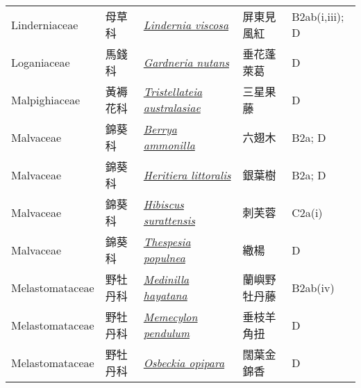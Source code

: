 {\begin{longtable}{p{2.5cm}p{2.5cm}p{4.5cm}p{2.5cm}p{3cm}}
    Linderniaceae & 母草科 & \href{http://www.theplantlist.org/tpl1.1/search?q=Lindernia+viscosa}{\textit{Lindernia viscosa} } & 屏東見風紅 & B2ab(i,iii); D \index{Lindernia@\textit{Lindernia}!viscosa@\textit{viscosa}}  \index{屏東見風紅} \\
    Loganiaceae & 馬錢科 & \href{http://www.theplantlist.org/tpl1.1/search?q=Gardneria+nutans}{\textit{Gardneria nutans} } & 垂花蓬萊葛 & D \index{Gardneria@\textit{Gardneria}!nutans@\textit{nutans}}  \index{垂花蓬萊葛} \\
    Malpighiaceae & 黃褥花科 & \href{http://www.theplantlist.org/tpl1.1/search?q=Tristellateia+australasiae}{\textit{Tristellateia australasiae} } & 三星果藤 & D \index{Tristellateia@\textit{Tristellateia}!australasiae@\textit{australasiae}}  \index{三星果藤} \\
    Malvaceae & 錦葵科 & \href{http://www.theplantlist.org/tpl1.1/search?q=Berrya+ammonilla}{\textit{Berrya ammonilla} } & 六翅木 & B2a; D \index{Berrya@\textit{Berrya}!ammonilla@\textit{ammonilla}}  \index{六翅木} \\
    Malvaceae & 錦葵科 & \href{http://www.theplantlist.org/tpl1.1/search?q=Heritiera+littoralis}{\textit{Heritiera littoralis} } & 銀葉樹 & B2a; D \index{Heritiera@\textit{Heritiera}!littoralis@\textit{littoralis}}  \index{銀葉樹} \\
    Malvaceae & 錦葵科 & \href{http://www.theplantlist.org/tpl1.1/search?q=Hibiscus+surattensis}{\textit{Hibiscus surattensis} } & 刺芙蓉 & C2a(i) \index{Hibiscus@\textit{Hibiscus}!surattensis@\textit{surattensis}}  \index{刺芙蓉} \\
    Malvaceae & 錦葵科 & \href{http://www.theplantlist.org/tpl1.1/search?q=Thespesia+populnea}{\textit{Thespesia populnea} } & 繖楊 & D \index{Thespesia@\textit{Thespesia}!populnea@\textit{populnea}}  \index{繖楊} \\
    Melastomataceae & 野牡丹科 & \href{http://www.theplantlist.org/tpl1.1/search?q=Medinilla+hayatana}{\textit{Medinilla hayatana} } & 蘭嶼野牡丹藤 & B2ab(iv) \index{Medinilla@\textit{Medinilla}!hayatana@\textit{hayatana}}  \index{蘭嶼野牡丹藤} \\
    Melastomataceae & 野牡丹科 & \href{http://www.theplantlist.org/tpl1.1/search?q=Memecylon+pendulum}{\textit{Memecylon pendulum} } & 垂枝羊角扭 & D \index{Memecylon@\textit{Memecylon}!pendulum@\textit{pendulum}}  \index{垂枝羊角扭} \\
    Melastomataceae & 野牡丹科 & \href{http://www.theplantlist.org/tpl1.1/search?q=Osbeckia+opipara}{\textit{Osbeckia opipara} } & 闊葉金錦香 & D \index{Osbeckia@\textit{Osbeckia}!opipara@\textit{opipara}}  \index{闊葉金錦香} \\

\end{longtable}}
